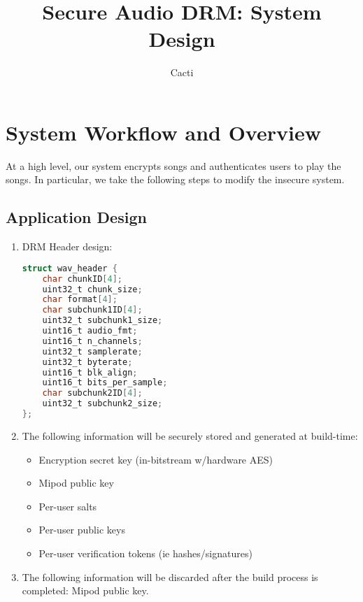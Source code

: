 \documentclass[11pt]{extarticle}
\title{Secure Audio DRM: System Design}
\author{Cacti}
\date{}
\begin{document}
\maketitle

\section{System Workflow and Overview}
At a high level, our system encrypts songs and authenticates users to play the songs.
In particular, we take the following steps to modify the insecure system.

\subsection{Application Design}

\begin{enumerate}
    \item DRM Header design:
    \begin{lstlisting}[language=C, label={lst:cache}, style=manual_code]
struct wav_header {
    char chunkID[4];
    uint32_t chunk_size;
    char format[4];
    char subchunk1ID[4];
    uint32_t subchunk1_size;
    uint16_t audio_fmt;
    uint16_t n_channels;
    uint32_t samplerate;
    uint32_t byterate;
    uint16_t blk_align;
    uint16_t bits_per_sample;
    char subchunk2ID[4];
    uint32_t subchunk2_size;
};
    \end{lstlisting}

    \item The following information will be securely stored and generated at build-time:
    \begin{itemize}
        \item Encryption secret key (in-bitstream w/hardware AES)
        \item Mipod public key
        \item Per-user salts
        \item Per-user public keys
        \item Per-user verification tokens (ie hashes/signatures)
    \end{itemize}

    \item The following information will be discarded after the build process is completed: Mipod public key.


\end{enumerate}
\end{document}
